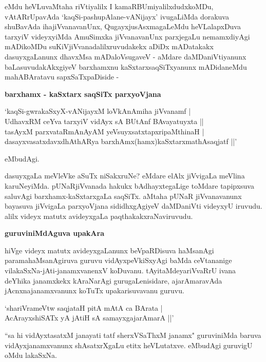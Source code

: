 \noindent
eMdu heVLuvaMtaha riVtiyalilx I kamaRBUmiyalilxdudxkoMDu, vAtAR\-rUpavAda `kaqSi-pashu\-pAlane-vANijayx' ivugaLiMda dorakuva shuBavAda ihajiVvanavanUnx, QugayxjusAsxmagaLeMdu heVLalapx\-Duva tarxyiV videyxyiMda AmuSimxka jiVvanavanUnx parxjegaLu nemamxdiyAgi mADikoMDu suKiVjiVvana\-dalilxru\-vudakekx aDiDx mADatakakx dasuyxgaLanunx dhavxMsa mADaloVsugaveV - aMdare daMDaniVtiyanunx baLasu\-vuda\-kAkxgiyeV barxhamxnu kaSxtarxsaqSiTxyanunx mADidaneMdu mahABAratavu sapxSaTxpaDiside - 

{\bigskip
\noindent
{\large\bf barxhamx - kaSxtarx saqSiTx parxyoVjana}}\label{page91}
\medskip

\begin{shloka}
`kaqSi-gwrakaSxyX-vANijayxM loVkAnAmiha jiVvanamf |\\\label{91}
UdhavxRM ceYva tarxyiV vidAyx sA BUtAnf BAvayatuyxta ||\\
tasAyxM parxvataRmAnAyAM yeVsuyxsatxtapxripaMthinaH |\\
dasayxvasatxdavxdhAthARya barxhAmx(hamx)kaSxtarxmathAsaqjatf ||'
\end{shloka}

\noindent
eMbudAgi.

dasuyxgaLa meVleVke aSuTx niSakxruNe? eMdare elAlx jiVvigaLa meVlina karuNeyiMda. pUNaRjiVvanada hakukx bAdhayxtegaLige toMdare tapipxsuva saluvAgi barxhamx-kaSxtarxgaLa saqSiTx. aMtaha pUNaR jiVvanavanunx baya\-suva jiVvigaLa parxyoVjana sididhxgAgiyeV daMDaniVti videyxyU iruvudu. alilx videyx matutx avideyxgaLa paqthakakxraNaviruvudu.

{\bigskip
\noindent
{\large\bf guruviniMdAguva upakAra}}\label{page91}
\medskip

\noindent
hiVge videyx matutx avideyxgaLanunx beVpaRDisuva haMsanAgi paramahaMsanAgiruva guruvu vidAyx\-peVkiSxyAgi baMda ceVtananige vilakaSxNa-jAti-janamxvanenxV koDuvanu. tAyitaMdeyariVvaRrU ivana deYhika janamxkekx kAraNarAgi gurugaLenisidare, ajarAmaravAda jAcnxnajanamxvanunx koTuTx upakarisuvavanu guruvu.

\begin{shloka}
`shariVrameVtw saqjataH pitA mAtA ca BArata |\\\label{91}
AcArayxshiSATx yA jAtiH sA samayxgajarAmarA ||'
\end{shloka}
\medskip

\noindent
``sa hi vidAyxtasatxM janayati tatf sherxVSaThxM janamx"\label{91} guruviniMda baruva vidAyxjanamxvanunx shAsatxrXgaLu etitx heVLu\-tatxve. eMbudAgi guruvigU oMdu lakaSxNa.

